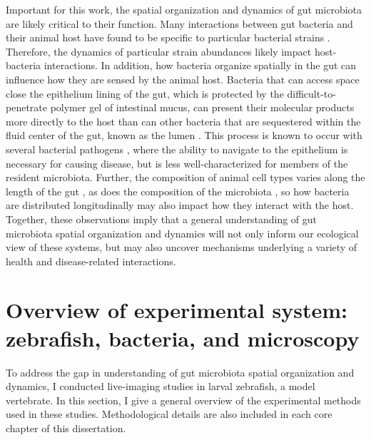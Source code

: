 Important for this work, the spatial organization and dynamics of gut microbiota are likely critical to their function. Many interactions between gut bacteria and their animal host have found to be specific to particular bacterial strains \cite{wiles2020patterns}. Therefore, the dynamics of particular strain abundances likely impact host-bacteria interactions. In addition, how bacteria organize spatially in the gut can influence how they are sensed by the animal host. Bacteria that can access space close the epithelium lining of the gut, which is protected by the difficult-to-penetrate polymer gel of intestinal mucus, can present their molecular products more directly to the host than can other bacteria that are sequestered within the fluid center of the gut, known as the lumen \cite{johansson_gastrointestinal_2013,cullender_innate_2013,vaishnava_antibacterial_2011}. This process is known to occur with several bacterial pathogens \cite{chow_pathobionts_2011,gevers_treatment-naive_2014,kostic_microbiome_2014,carvalho_transient_2012}, where the ability to navigate to the epithelium is necessary for causing disease, but is less well-characterized for members of the resident microbiota. Further, the composition of animal cell types varies along the length of the gut \cite{lickwar_genomic_2017}, as does the composition of the microbiota \cite{donaldson_gut_2015}, so how bacteria are distributed longitudinally may also impact how they interact with the host. Together, these observations imply that a general understanding of gut microbiota spatial organization and dynamics will not only inform our ecological view of these systems, but may also uncover mechanisms underlying a variety of health and disease-related interactions.  


\section{Overview of experimental system: zebrafish, bacteria, and microscopy}

To address the gap in understanding of gut microbiota spatial organization and dynamics, I conducted live-imaging studies in larval zebrafish, a model vertebrate. In this section, I give a general overview of the experimental methods used in these studies. Methodological details are also included in each core chapter of this dissertation. 

